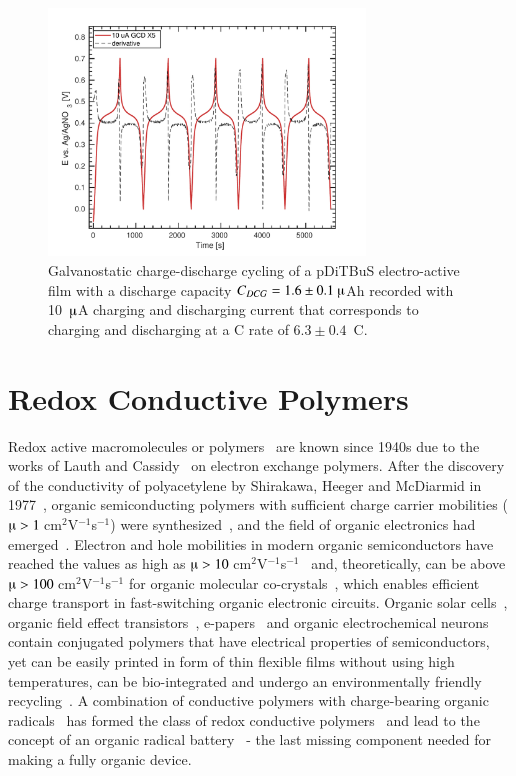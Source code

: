 \begin{figure}[h]
\center
	\includegraphics[width=0.75\textwidth]{./electrochemistry/figures/GCD_pDiTBuS.pdf}
	\caption{Galvanostatic charge-discharge cycling of a pDiTBuS electro-active film with a discharge capacity $C_{DCG}=1.6\pm0.1~\muup$Ah recorded with 10~$\muup$A charging and discharging current that corresponds to charging and discharging at a C rate of $6.3\pm0.4$~C.}
	\label{fig:GCD_DiTBuS}
\end{figure}


\section{Redox Conductive Polymers}

Redox active macromolecules or polymers~\cite{Staudinger_1920} are known since 1940s due to the works of Lauth and Cassidy~\cite{Cassidy_1949} on electron exchange polymers. After the discovery of the conductivity of polyacetylene by Shirakawa, Heeger and McDiarmid in 1977~\cite{Shirakawa_1977}, organic semiconducting polymers with sufficient charge carrier mobilities ($\muup>1~$cm$^2$V$^{-1}$s$^{-1}$) were synthesized~\cite{Hu2021}, and the field of organic electronics had emerged~\cite{heeger_polymers,Casado_2021_book}. Electron and hole mobilities in modern organic semiconductors have reached the values as high as $\muup>10~$cm$^2$V$^{-1}$s$^{-1}$~\cite{Hu2021} and, theoretically, can be above $\muup>100~$cm$^2$V$^{-1}$s$^{-1}$ for organic molecular co-crystals~\cite{Zhu2012}, which enables efficient charge transport in fast-switching organic electronic circuits. Organic solar cells~\cite{Lee_1993}, organic field effect transistors~\cite{Koezuka_1987,Yan2009}, e-papers~\cite{Hu2021} and organic electrochemical neurons~\cite{Harikesh2022} contain conjugated polymers that have electrical properties of semiconductors, yet can be easily printed in form of thin flexible films without using high temperatures, can be bio-integrated and undergo an environmentally friendly recycling~\cite{nishide_2009}. A combination of conductive polymers with charge-bearing organic radicals~\cite{IWASA2007} has formed the class of redox conductive polymers~\cite{Casado_2021_book} and lead to the concept of an organic radical battery~\cite{Rohland_2021,nishide2004_electact,nakahara2002_cpl,Xie2021} - the last missing component needed for making a fully organic device.

